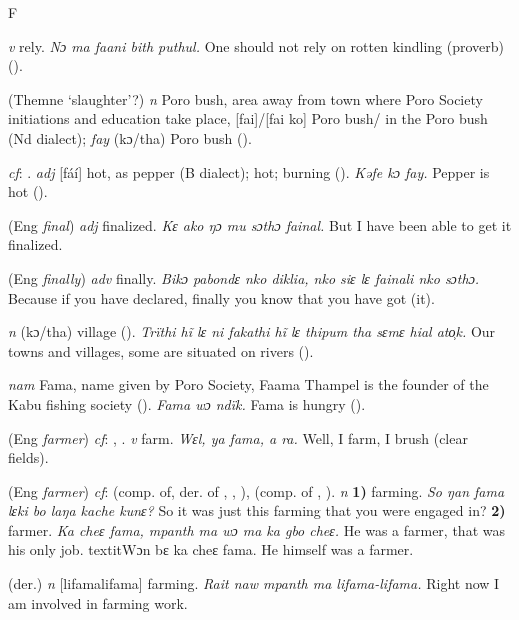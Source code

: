 \begin{letter}{F}

 \textit{v} rely. \textit{Nɔ ma faani bith puthul.} One should not rely on rotten kindling (proverb) (\citealt{TISLL1979}). 

 (Themne ‘slaughter'?) \textit{n} Poro bush, area away from town where Poro Society initiations and education take place, [fai]/[fai ko] Poro bush/ in the Poro bush (Nd dialect); \textit{fay} (kɔ/tha) Poro bush (\citealt{Pichl1967}). 

 \textit{cf}: . \textit{adj} [fáí] hot, as pepper (B dialect); hot; burning (\citealt{Pichl1967}). \textit{Kəfe kɔ fay.} Pepper is hot (\citealt{Pichl1967}). 

 (Eng \textit{final}) \textit{adj} finalized. \textit{Kɛ ako ŋɔ mu sɔthɔ fainal.} But I have been able to get it finalized. 

 (Eng \textit{finally}) \textit{adv} finally. \textit{Bikɔ pabondɛ nko diklia, nko siɛ lɛ fainali nko sɔthɔ.} Because if you have declared, finally you know that you have got (it). 

 \textit{n} (kɔ/tha) village (\citealt{Pichl1967}). \textit{Trïthi hĩ lɛ ni fakathi hĩ lɛ thipum tha sɛmɛ hial ato̹k.} Our towns and villages, some are situated on rivers (\citealt{Pichl1967}). 

 \textit{nam} Fama, name given by Poro Society, Faama Thampel is the founder of the Kabu fishing society (\citealt{Pichl1967}). \textit{Fama wɔ ndïk.} Fama is hungry (\citealt{Pichl1967}). 

 (Eng \textit{farmer}) \textit{cf}: , . \textit{v} farm. \textit{Wɛl, ya fama, a ra.} Well, I farm, I brush (clear fields).

 (Eng \textit{farmer}) \textit{cf}:  (comp. of, der. of , , ),  (comp. of , ). \textit{n} \textbf{1)} farming. \textit{So ŋan fama lɛki bo laŋa kache kunɛ?} So it was just this farming that you were engaged in? \textbf{2)} farmer. \textit{Ka cheɛ fama, mpanth ma wɔ ma ka gbo cheɛ.} He was a farmer, that was his only job. textit{Wɔn bɛ ka cheɛ fama.} He himself was a farmer. 

 (der.) \textit{n} [lifamalifama] farming. \textit{Rait naw mpanth ma lifama-lifama.} Right now I am involved in farming work. 


\end{letter}
